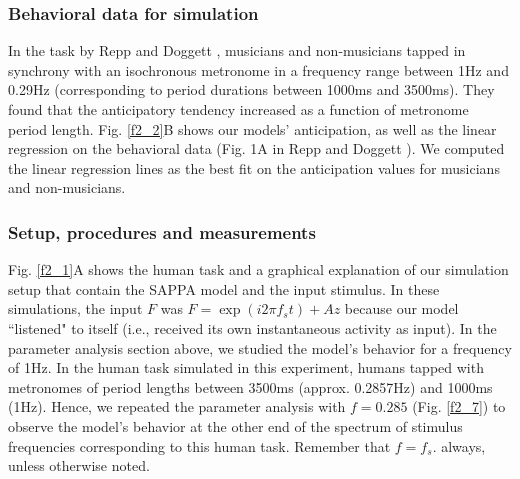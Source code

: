 \documentclass{report}
\begin{document}
\subsubsection{Behavioral data for simulation}

In the task by Repp and Doggett \cite{repp2007tapping}, musicians and non-musicians tapped in synchrony with an isochronous metronome in a frequency range between 1Hz and 0.29Hz (corresponding to period durations between 1000ms and 3500ms). They found that the anticipatory tendency increased as a function of metronome period length. Fig.{} \ref{f2_2}B shows our models' anticipation, as well as the linear regression on the behavioral data (Fig.{} 1A in Repp and Doggett \cite{repp2007tapping}). We computed the linear regression lines as the best fit on the anticipation values for musicians and non-musicians.

\subsubsection{Setup, procedures and measurements}

Fig.{} \ref{f2_1}A shows the human task and a graphical explanation of our simulation setup that contain the SAPPA model and the input stimulus. In these simulations, the input $F$ was $F = \exp(i2\pi f_s t) + Az$ because our model ``listened" to itself (i.e., received its own instantaneous activity as input). In the parameter analysis section above, we studied the model's behavior for a frequency of 1Hz. In the human task simulated in this experiment, humans tapped with metronomes of period lengths between 3500ms (approx. 0.2857Hz) and 1000ms (1Hz). Hence, we repeated the parameter analysis with $f = 0.285$ (Fig.{} \ref{f2_7}) to observe the model's behavior at the other end of the spectrum of stimulus frequencies corresponding to this human task. Remember that $f = f_s$. always, unless otherwise noted.
\end{document}

